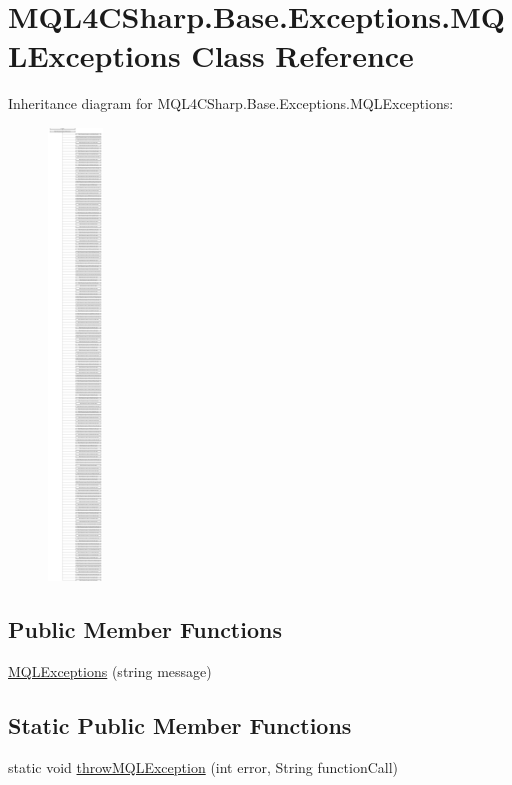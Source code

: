 \hypertarget{class_m_q_l4_c_sharp_1_1_base_1_1_exceptions_1_1_m_q_l_exceptions}{}\section{M\+Q\+L4\+C\+Sharp.\+Base.\+Exceptions.\+M\+Q\+L\+Exceptions Class Reference}
\label{class_m_q_l4_c_sharp_1_1_base_1_1_exceptions_1_1_m_q_l_exceptions}
Inheritance diagram for M\+Q\+L4\+C\+Sharp.\+Base.\+Exceptions.\+M\+Q\+L\+Exceptions\+:\begin{figure}[H]
\begin{center}
\leavevmode
\includegraphics[height=12.000000cm]{class_m_q_l4_c_sharp_1_1_base_1_1_exceptions_1_1_m_q_l_exceptions}
\end{center}
\end{figure}
\subsection*{Public Member Functions}
\begin{DoxyCompactItemize}
\item 
\hyperlink{class_m_q_l4_c_sharp_1_1_base_1_1_exceptions_1_1_m_q_l_exceptions_a12e1fca77074fd7eb0850ed8dd9fcd0c}{M\+Q\+L\+Exceptions} (string message)
\end{DoxyCompactItemize}
\subsection*{Static Public Member Functions}
\begin{DoxyCompactItemize}
\item 
static void \hyperlink{class_m_q_l4_c_sharp_1_1_base_1_1_exceptions_1_1_m_q_l_exceptions_ae941073d845c75b740fb0670354636a0}{throw\+M\+Q\+L\+Exception} (int error, String function\+Call)
\end{DoxyCompactItemize}


